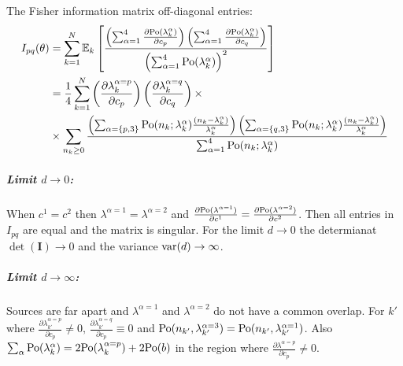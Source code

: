 The Fisher information matrix off-diagonal entries:
%
\begin{alignat*}{2}
	I_{pq}(\theta) 
	& =\sum_{k=1}^N\mathbb{E}_k\left[\frac{\left(\sum_{\alpha=1}^4\frac{\partial\mathrm{Po}(\lambda_k^\alpha)}{\partial c_p}\right)\left(\sum_{\alpha=1}^4\frac{\partial\mathrm{Po}(\lambda_k^\alpha)}{\partial c_q}\right)}{\left(\sum_{\alpha=1}^4\mathrm{Po}(\lambda_k^\alpha)\right)^2}\right]\nonumber \\
 	& =\frac{1}{4}\sum_{k=1}^N\left(\frac{\partial\lambda_k^{\alpha=p}}{\partial c_p}\right)\left(\frac{\partial\lambda_k^{\alpha=q}}{\partial c_q}\right)\times\\
	&\times\sum_{n_k\geq0}\frac{\left(\sum_{\alpha=\{p,3\}}\mathrm{Po}(n_k;\lambda_k^\alpha)\frac{(n_k-\lambda_k^\alpha)}{\lambda_k^\alpha}\right)\left(\sum_{\alpha=\{q,3\}}\mathrm{Po}(n_k;\lambda_k^\alpha)\frac{(n_k-\lambda_k^\alpha)}{\lambda_k^\alpha}\right)}{\sum_{\alpha=1}^4\mathrm{Po}(n_k;\lambda_k^\alpha)}
	\label{eq:app-Fisher Info Integrated Out-off diagonal entries}
\end{alignat*}

\subparagraph*{Limit $d\rightarrow0$:}

When $c^1=c^2$ then $\lambda^{\alpha=1}=\lambda^{\alpha=2}$ and $\frac{\partial\mathrm{Po}(\lambda^{\alpha=1})}{\partial c^1}=\frac{\partial\mathrm{Po}(\lambda^{\alpha=2})}{\partial c^2}$.
Then all entries in $I_{pq}$ are equal and the matrix is singular. For the limit $d\rightarrow0$ the determianat $\det(\bm{I})\rightarrow0$ and the variance $\mathrm{var}(d)\rightarrow\infty$.

\subparagraph*{Limit $d\rightarrow\infty$:}

Sources are far apart and $\lambda^{\alpha=1}$ and $\lambda^{\alpha=2}$ do not have a common overlap. For $k'$ where $\frac{\partial\lambda_{k'}^{\alpha=p}}{\partial c_p}\neq0,\,\frac{\partial\lambda_{k'}^{\alpha=q}}{\partial c_p}\equiv0$ and $\mathrm{Po}(n_{k'},\lambda_{k'}^{\alpha=3})=\mathrm{Po}(n_{k'},\lambda_{k'}^{\alpha=1})$. Also $\sum_\alpha\mathrm{Po}(\lambda_k^\alpha)=2\mathrm{Po}(\lambda_k^{\alpha=p})+2\mathrm{Po}(b)$ in the region where $\frac{\partial\lambda^{\alpha=p}}{\partial c_p}\neq 0$.

